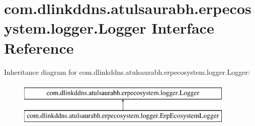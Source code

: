 \hypertarget{interfacecom_1_1dlinkddns_1_1atulsaurabh_1_1erpecosystem_1_1logger_1_1_logger}{}\section{com.\+dlinkddns.\+atulsaurabh.\+erpecosystem.\+logger.\+Logger Interface Reference}
\label{interfacecom_1_1dlinkddns_1_1atulsaurabh_1_1erpecosystem_1_1logger_1_1_logger}
Inheritance diagram for com.\+dlinkddns.\+atulsaurabh.\+erpecosystem.\+logger.\+Logger\+:\begin{figure}[H]
\begin{center}
\leavevmode
\includegraphics[height=2.000000cm]{interfacecom_1_1dlinkddns_1_1atulsaurabh_1_1erpecosystem_1_1logger_1_1_logger}
\end{center}
\end{figure}
